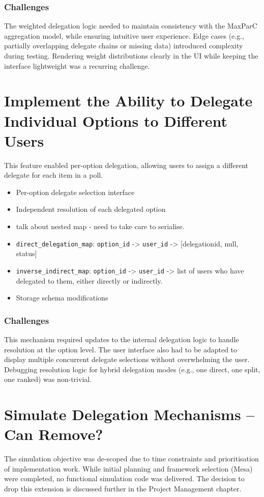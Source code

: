\subsubsection{Challenges}
The weighted delegation logic needed to maintain consistency with the MaxParC aggregation model, while ensuring intuitive user experience. Edge cases (e.g., partially overlapping delegate chains or missing data) introduced complexity during testing. Rendering weight distributions clearly in the UI while keeping the interface lightweight was a recurring challenge.

\section{Implement the Ability to Delegate Individual Options to Different Users}
This feature enabled per-option delegation, allowing users to assign a different delegate for each item in a poll.

\begin{itemize}
  \item Per-option delegate selection interface
  \item Independent resolution of each delegated option
  \item talk about nested map - need to take care to serialise.
  \item \verb|direct_delegation_map|: \verb|option_id| -> \verb|user_id| -> [delegationid, null, status]
  \item \verb|inverse_indirect_map|: \verb|option_id| -> \verb|user_id| -> list of users who have delegated to them, either directly or indirectly.
  \item Storage schema modifications
\end{itemize}

\subsubsection{Challenges}
This mechanism required updates to the internal delegation logic to handle resolution at the option level. The user interface also had to be adapted to display multiple concurrent delegate selections without overwhelming the user. Debugging resolution logic for hybrid delegation modes (e.g., one direct, one split, one ranked) was non-trivial.

\section{Simulate Delegation Mechanisms -- Can Remove?}
The simulation objective was de-scoped due to time constraints and prioritisation of implementation work. While initial planning and framework selection (Mesa) were completed, no functional simulation code was delivered. The decision to drop this extension is discussed further in the Project Management chapter.

